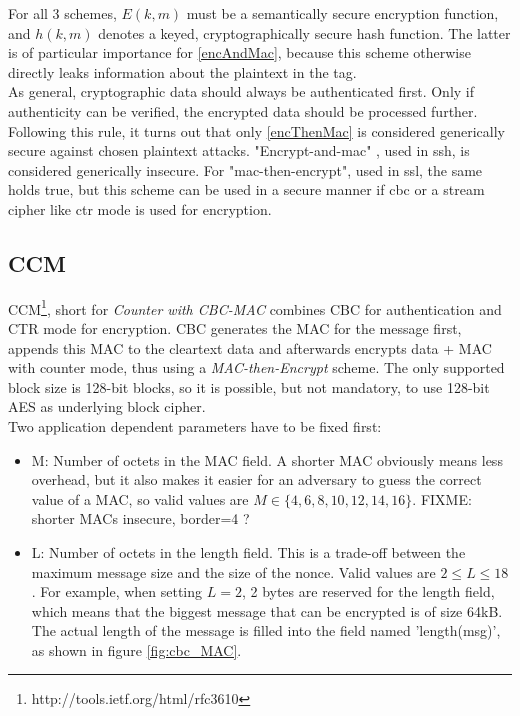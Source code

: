 For all 3 schemes, $E(k, m)$ must be a semantically secure encryption function, and $h(k, m)$ denotes a keyed, cryptographically secure hash function.
The latter is of particular importance for \ref{encAndMac}, because this scheme otherwise directly leaks information about the plaintext in the tag. 
\\
As general, cryptographic data should always be authenticated first. Only if authenticity can be verified,
the encrypted data should be processed further.
Following this rule, it turns out that only \ref{encThenMac} is considered generically secure against chosen plaintext attacks.
"Encrypt-and-mac" \cite{sshBellare}, used in \gls{ssh}, is considered generically
insecure. For "mac-then-encrypt", used in \gls{ssl}, the same holds true, but this scheme can be used in a secure manner if \gls{cbc} or a stream cipher like 
\gls{ctr} mode is used for encryption.

\subsection{CCM}

CCM\footnote{http://tools.ietf.org/html/rfc3610}, short for \textit{Counter with CBC-MAC} combines CBC for authentication and CTR mode for encryption.
CBC generates the MAC for the message first, appends this MAC to the cleartext data and afterwards encrypts data + MAC with counter mode, thus using a
\textit{MAC-then-Encrypt} scheme. The only
supported block size is 128-bit blocks, so it is possible, but not mandatory, to use 128-bit AES as underlying block cipher.
\\
Two application dependent parameters have to be fixed first: 
\begin{itemize}
 \item M: Number of octets in the MAC field. A shorter MAC obviously means less overhead, but it also makes it easier for an adversary to guess the correct
 value of a MAC, so valid values are $M \in \{4, 6, 8, 10, 12, 14, 16\}$. FIXME: shorter MACs insecure, border=4 ? 
 \item L: Number of octets in the length field. This is a trade-off between the maximum message size and the size of the nonce. Valid values are $2 \leq L \leq 18$.
 For example, when setting $L = 2$, 2 bytes are reserved for the length field, which means that the biggest message that can be encrypted is of size 64kB. The actual
 length of the message is filled into the field named 'length(msg)', as shown in figure \ref{fig:cbc_MAC}.
\end{itemize}

